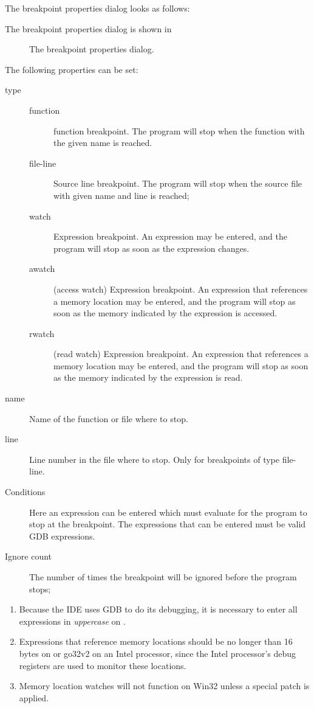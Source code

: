 \begin{htmlonly}
The breakpoint properties dialog looks as follows:
\end{htmlonly}
\begin{latexonly}
The breakpoint properties dialog is shown in 
\begin{figure}[ht]
\caption{The breakpoint properties dialog.}\label{fig:brkprop}
\ifpdf
{}
\else
{}
\fi
\end{figure}
\end{latexonly}
The following properties can be set:
\begin{description}
\item[type]
\begin{description}
\item[function] function breakpoint. The program will stop when the function
with the given name is reached.
\item[file-line] Source line breakpoint. The program will stop when the
source file with given name and line is reached;
\item[watch] Expression breakpoint. An expression may be entered, and the
program will stop as soon as the expression changes.
\item[awatch] (access watch) Expression breakpoint. An expression that references a 
memory location may be entered, and the program will stop as soon as 
the memory indicated by the expression is accessed.
\item[rwatch] (read watch) Expression breakpoint. An expression that references a
memory location may be entered, and the program will stop as soon as 
the memory indicated by the expression is read.
\end{description}
\item[name] Name of the function or file where to stop.
\item[line] Line number in the file where to stop. Only for breakpoints of
type file-line.
\item[Conditions] Here an expression can be entered which must evaluate 
 for the program to stop at the breakpoint. The expressions that
can be entered must be valid GDB expressions.
\item[Ignore count] The number of times the breakpoint will be ignored
before the program stops; 
\end{description}
\begin{remark}
\begin{enumerate}
\item Because the IDE uses GDB to do its debugging, it is necessary to enter all
expressions in {\em uppercase} on \freebsd. 
\item Expressions that reference memory locations should be no longer than 16 
bytes on \linux or go32v2 on an Intel processor, since the Intel processor's 
debug registers are used to monitor these locations.
\item Memory location watches will not function on Win32 unless a special 
patch is applied. 
\end{enumerate}
\end{remark}

